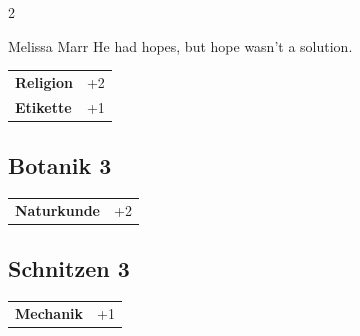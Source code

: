 \begin{multicols}{2}
\begin{tcolorbox}
\begin{pquote}{Melissa Marr}
He had hopes, but hope wasn't a solution.
\end{pquote}

\vspace{3mm}

\begin{tabular}{@{}ll@{}}
    \textbf{Religion} & +2\\
    \textbf{Etikette} & +1\\
\end{tabular}


\end{tcolorbox}

\begin{tcolorbox}
    \subsection*{Botanik \hfill \small{3 }}
    \tcblower




\begin{tabular}{@{}ll@{}}
    \textbf{Naturkunde} & +2\\
\end{tabular}


\end{tcolorbox}

\begin{tcolorbox}
    \subsection*{Schnitzen \hfill \small{3 }}
    \tcblower




\begin{tabular}{@{}ll@{}}
    \textbf{Mechanik} & +1\\
\end{tabular}


\end{tcolorbox}


\end{multicols}
